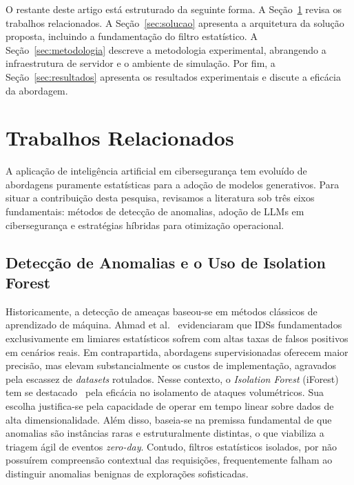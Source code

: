 \documentclass[sigconf, anonymous]{acmart}
\begin{document}
O restante deste artigo está estruturado da seguinte forma. A Seção~\ref{sec:relacionados} revisa os trabalhos relacionados. A Seção~\ref{sec:solucao} apresenta a arquitetura da solução proposta, incluindo a fundamentação do filtro estatístico. A Seção~\ref{sec:metodologia} descreve a metodologia experimental, abrangendo a infraestrutura de servidor e o ambiente de simulação. Por fim, a Seção~\ref{sec:resultados} apresenta os resultados experimentais e discute a eficácia da abordagem.

\section{Trabalhos Relacionados}
\label{sec:relacionados}

A aplicação de inteligência artificial em cibersegurança tem evoluído de abordagens puramente estatísticas para a adoção de modelos generativos. Para situar a contribuição desta pesquisa, revisamos a literatura sob três eixos fundamentais: métodos de detecção de anomalias, adoção de \acp{LLM} em cibersegurança e estratégias híbridas para otimização operacional.

\subsection{Detecção de Anomalias e o Uso de Isolation Forest}
Historicamente, a detecção de ameaças baseou-se em métodos clássicos de aprendizado de máquina. Ahmad et al.~\cite{ahmad2021network} evidenciaram que \acp{IDS} fundamentados exclusivamente em limiares estatísticos sofrem com altas taxas de falsos positivos em cenários reais. Em contrapartida, abordagens supervisionadas oferecem maior precisão, mas elevam substancialmente os custos de implementação, agravados pela escassez de \textit{datasets} rotulados. Nesse contexto, o \textit{Isolation Forest} (iForest) tem se destacado~\cite{alhumaima2026comprehensive, maspo2026anomaly} pela eficácia no isolamento de ataques volumétricos. Sua escolha justifica-se pela capacidade de operar em tempo linear sobre dados de alta dimensionalidade. Além disso, baseia-se na premissa fundamental de que anomalias são instâncias raras e estruturalmente distintas, o que viabiliza a triagem ágil de eventos \textit{zero-day}. Contudo, filtros estatísticos isolados, por não possuírem compreensão contextual das requisições, frequentemente falham ao distinguir anomalias benignas de explorações sofisticadas.
\end{document}
